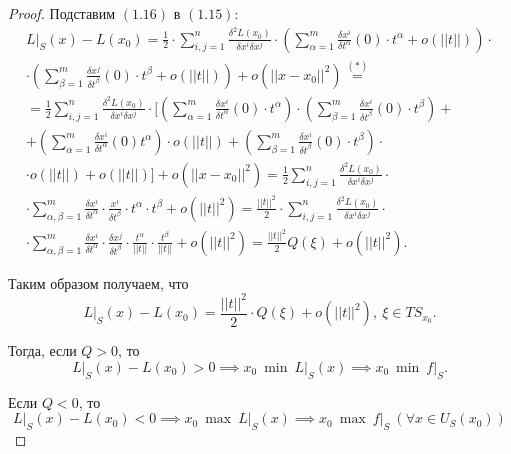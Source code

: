 \documentclass{report}
\theoremstyle{definition}
\begin{document}
\begin{proof}
  Подставим $(1.16)$ в $(1.15)$:
  \begin{multline*}
    L\big|_S(x) - L(x_0) = \frac{1}{2}\cdot\sum_{i,j=1}^{n}\frac{\delta^2L(x_0)}{\delta x^i \delta x^j} \cdot(\sum_{\alpha=1}^{m}\frac{\delta x^i}{\delta t^\alpha}(0)\cdot t^\alpha + o(||t||))\cdot \\
    \cdot(\sum_{\beta=1}^{m}\frac{\delta x^j}{\delta t^\beta}(0)\cdot t^\beta + o(||t||)) + o(||x-x_0||^2) \overset{(*)}{=} \\
    = \frac{1}{2}\sum_{i,j=1}^{n}\frac{\delta^2 L(x_0)}{\delta x^i \delta x^j}\cdot\big[(\sum_{\alpha=1}^{m}\frac{\delta x^i}{\delta t^\alpha}(0)\cdot t^\alpha)\cdot(\sum_{\beta=1}^{m}\frac{\delta x^i}{\delta t^\beta}(0)\cdot t^\beta) + \\
      + (\sum_{\alpha=1}^{m}\frac{\delta x^i}{\delta t^\alpha}(0)t^\alpha)\cdot o(||t||) + (\sum_{\beta=1}^{m}\frac{\delta x^i}{\delta t^\beta}(0)\cdot t^\beta)\cdot \\
      \cdot o(||t||) + o(||t||)\big] + o(||x-x_0||^2) = \frac{1}{2}\sum_{i,j=1}^{n}\frac{\delta^2 L(x_0)}{\delta x^i \delta x^j} \cdot \\
    \cdot \sum_{\alpha,\beta = 1}^{m}\frac{\delta x^i}{\delta t^\alpha} \cdot \frac{x^i}{\delta t^\beta} \cdot t^\alpha \cdot t^\beta + o(||t||^2) = \frac{||t||^2}{2} \cdot \sum_{i,j=1}^{n}\frac{\delta^2 L(x_0)}{\delta x^i\delta x^j} \cdot \\
    \cdot \sum_{\alpha,\beta=1}^{m}\frac{\delta x^i}{\delta t^\alpha}\cdot \frac{\delta x^j}{\delta t^\beta} \cdot \frac{t^\alpha}{||t||} \cdot \frac{t^\beta}{||t||} + o(||t||^2) = \frac{||t||^2}{2}Q(\xi) + o(||t||^2).
  \end{multline*}

  Таким образом получаем, что
  \begin{equation*}
    L\big|_S(x) - L(x_0) = \frac{||t||^2}{2} \cdot Q(\xi) + o(||t||^2), \ \xi \in TS_{x_0}.
  \end{equation*}

  Тогда, если $Q> 0$, то
  \begin{equation*}
    L\big|_S(x) - L(x_0)> 0 \implies x_0 \ \min \ L\big|_S(x) \implies x_0 \ \min \ f\big|_S.
  \end{equation*}

  Если $Q < 0$, то
  \begin{equation*}
    L\big|_S(x) - L(x_0) < 0 \implies x_0 \ \max \ L\big|_S(x) \implies x_0 \ \max \ f\big|_S \ (\forall x \in U_S(x_0))
  \end{equation*}


\end{proof}
\end{document}
